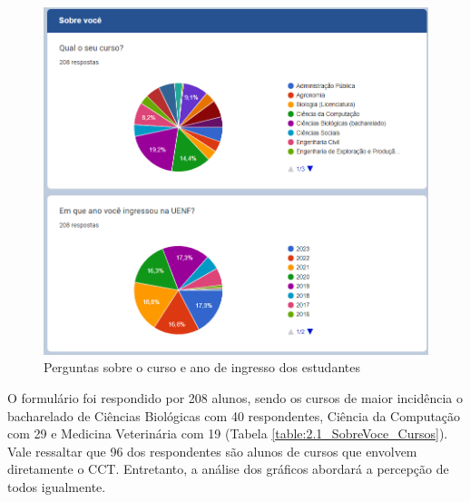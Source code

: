         \begin{figure}[htbp]\centering
            \caption{\label{fig:2.0-SobreVoce}Perguntas sobre o curso e ano de ingresso dos estudantes}
            \includegraphics[scale=0.8]{files/img/Forms/2.0-SobreVoce.png}
        \end{figure} %

        O formulário foi respondido por 208 alunos, sendo os cursos de maior incidência o bacharelado de Ciências Biológicas com 40 respondentes, Ciência da Computação com 29 e Medicina Veterinária com 19 (Tabela \ref{table:2.1_SobreVoce_Cursos}). Vale ressaltar que 96 dos respondentes são alunos de cursos que envolvem diretamente o CCT. Entretanto, a análise dos gráficos abordará a percepção de todos igualmente.


